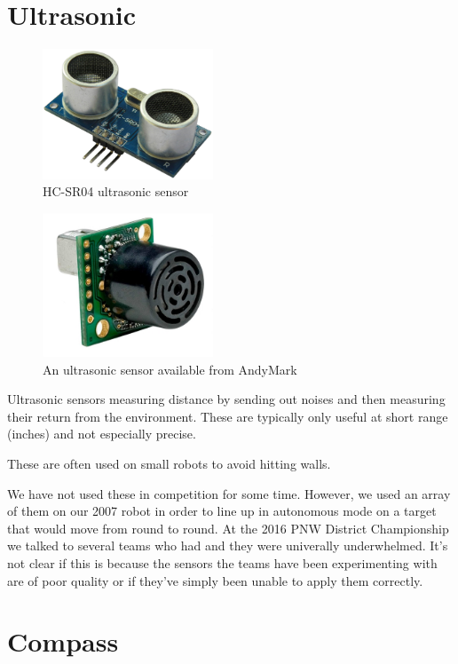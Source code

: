 \documentclass{article}
\begin{document}
\section{Ultrasonic}
\begin{figure}[ht]
\centering
\includegraphics[width=2in]{HC-SR04-lg.jpg}
\caption{HC-SR04 ultrasonic sensor}
\end{figure}

\begin{figure}[ht]
\centering
\includegraphics[width=2in]{ultrasonic.jpg}
\caption{An ultrasonic sensor available from AndyMark}
\end{figure}

Ultrasonic sensors measuring distance by sending out noises and then measuring their return from the environment.  These are typically only useful at short range (inches) and not especially precise.  

These are often used on small robots to avoid hitting walls.  

We have not used these in competition for some time.  However, we used an array of them on our 2007 robot in order to line up in autonomous mode on a target that would move from round to round.  At the 2016 PNW District Championship we talked to several teams who had and they were univerally underwhelmed.  It's not clear if this is because the sensors the teams have been experimenting with are of poor quality or if they've simply been unable to apply them correctly.

\section{Compass}
\end{document}
